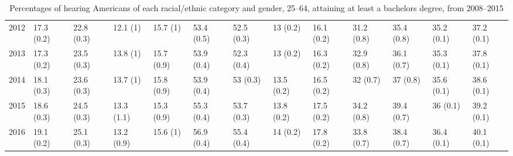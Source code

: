 \documentclass{article}\usepackage[]{graphicx}\usepackage[]{color}
\begin{document}
\begin{landscape}
\begin{table}[ht]
\begin{tabular}{rllllllllllll}
  2012 & 17.3 (0.2) & 22.8 (0.3) & 12.1 (1) & 15.7 (1) & 53.4 (0.5) & 52.5 (0.3) & 13 (0.2) & 16.1 (0.2) & 31.2 (0.8) & 35.4 (0.8) & 35.2 (0.1) & 37.2 (0.1) \\
  2013 & 17.3 (0.2) & 23.5 (0.3) & 13.8 (1) & 15.7 (0.9) & 53.9 (0.4) & 52.3 (0.4) & 13 (0.2) & 16.3 (0.2) & 32.9 (0.8) & 36.1 (0.7) & 35.3 (0.1) & 37.8 (0.1) \\
  2014 & 18.1 (0.3) & 23.6 (0.3) & 13.7 (1) & 15.8 (0.9) & 53.9 (0.4) & 53 (0.3) & 13.5 (0.2) & 16.5 (0.2) & 32 (0.7) & 37 (0.8) & 35.6 (0.1) & 38.6 (0.1) \\
  2015 & 18.6 (0.3) & 24.5 (0.3) & 13.3 (1.1) & 15.3 (0.9) & 55.3 (0.4) & 53.7 (0.3) & 13.8 (0.2) & 17.5 (0.2) & 34.2 (0.8) & 39.4 (0.7) & 36 (0.1) & 39.2 (0.1) \\
  2016 & 19.1 (0.2) & 25.1 (0.3) & 13.2 (0.9) & 15.6 (1) & 56.9 (0.4) & 55.4 (0.4) & 14 (0.2) & 17.8 (0.2) & 33.8 (0.7) & 38.4 (0.7) & 36.4 (0.1) & 40.1 (0.1) \\
   \hline
\end{tabular}
\caption{Percentages of hearing Americans of each racial/ethnic category and gender, 25--64, attaining at least a bachelors degree, from 2008--2015}
\end{table}

\end{landscape}
\FloatBarrier
\end{document}

